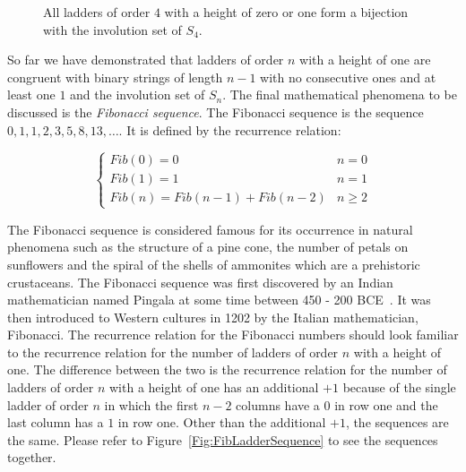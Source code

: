 \begin{figure}[ht]
        \caption{All ladders of order $4$ with a height of zero or one form a bijection with the involution set of $S_{4}$.}
        \label{Fig:BijectiveMapping}
\end{figure}
\pagebreak
So far we have demonstrated that ladders of order $n$ with a height of one are congruent with binary strings of length $n-1$ 
with no consecutive ones and at least one $1$ and the involution set of $S_{n}$. The final mathematical phenomena to be discussed 
is the \emph{Fibonacci sequence}. The Fibonacci sequence is the sequence $0,1,1,2,3,5,8,13, \dots$. It is defined by the
recurrence relation:\cite{A12}

 \[   
     \left\{
       \begin{array}{ll}
        Fib(0) = 0 & n = 0 \\
        Fib(1) = 1 & n=1 \\
        Fib(n) = Fib(n-1) + Fib(n-2) & n \geq 2 
        \end{array} 
    \right.
\]


The Fibonacci sequence is considered famous for its occurrence in natural phenomena such as the structure of a pine cone, the number of petals 
on sunflowers and the spiral of the shells of ammonites which are a prehistoric crustaceans. The Fibonacci sequence was first discovered by an 
Indian mathematician named Pingala at some time between 450 - 200 BCE~\cite{A16}. It was then introduced to Western cultures in 1202 by the 
Italian mathematician, Fibonacci. The recurrence relation for the Fibonacci numbers should look familiar to the recurrence 
relation for the number of ladders of order $n$ with a height of one. The difference between the two is the recurrence relation 
for the number of ladders of order $n$ with a height of one has an additional $+1$ because of the single ladder of 
order $n$ in which the first $n-2$ columns have a $0$ in row one and the last column has a $1$ in row one. Other than the additional 
$+1$, the sequences are the same. Please refer to Figure~\ref{Fig:FibLadderSequence} to see the sequences together.\newline
    
